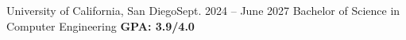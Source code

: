\resumeSubHeadingListStart
  \resumeSubheading
    {University of California, San Diego}{Sept. 2024 -- June 2027}
    {Bachelor of Science in Computer Engineering}{ \textbf{GPA: 3.9/4.0}}
\resumeSubHeadingListEnd
